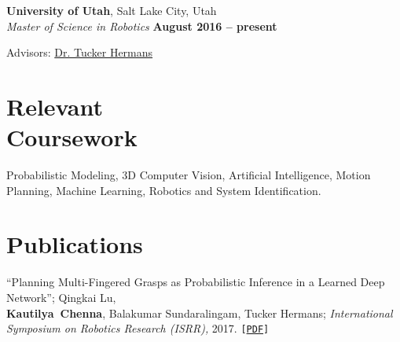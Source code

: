 \documentclass[letterpaper, margin, line]{resume}
\begin{document}
\begin{resume}
    \textbf{University of Utah}, Salt Lake City, Utah
    \vspace{0.5mm}\\\vspace{1mm}%
    \textsl{Master of Science in Robotics} \hfill \textbf{ August 2016 -- present}\vspace{-3mm}\\\vspace{-1mm}%
    \begin{list2}
        \item Advisors:  \href{https://www.cs.utah.edu/~thermans/}{Dr. Tucker Hermans}
    \end{list2}\vspace{-1.5mm}
	
	\section{\mysidestyle Relevant\\Coursework}
	Probabilistic Modeling, 3D Computer Vision, Artificial Intelligence, Motion Planning, Machine Learning, Robotics and System Identification.\vspace{-1mm}%
    
    
    \section{\mysidestyle Publications}
     ``Planning Multi-Fingered Grasps as Probabilistic Inference in a Learned Deep Network''; Qingkai Lu, \\
     \mbox{\bf Kautilya Chenna}, Balakumar Sundaralingam, Tucker Hermans; \textit{International Symposium on Robotics Research (ISRR),} 2017. \texttt{[\href{http://www.cs.utah.edu/~thermans/papers/lu-isrr2017-deep-multifinger-grasping.pdf}{PDF}]}
     \vspace{-1mm}%


\end{resume}
\end{document}

